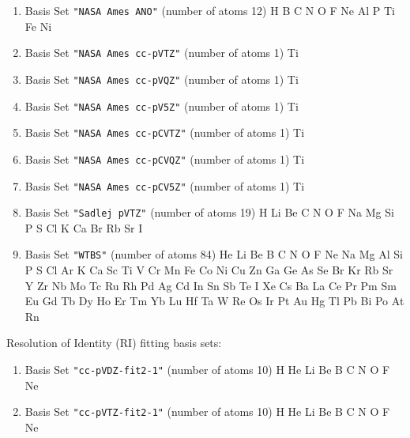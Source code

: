 \begin{enumerate}
\item Basis Set \verb#"NASA Ames ANO"# (number of atoms 12)  \newline
  H B C N O F Ne Al P Ti Fe Ni


\item Basis Set \verb#"NASA Ames cc-pVTZ"# (number of atoms 1)  \newline
  Ti


\item Basis Set \verb#"NASA Ames cc-pVQZ"# (number of atoms 1)  \newline
  Ti


\item Basis Set \verb#"NASA Ames cc-pV5Z"# (number of atoms 1)  \newline
  Ti


\item Basis Set \verb#"NASA Ames cc-pCVTZ"# (number of atoms 1)  \newline
  Ti


\item Basis Set \verb#"NASA Ames cc-pCVQZ"# (number of atoms 1)  \newline
  Ti


\item Basis Set \verb#"NASA Ames cc-pCV5Z"# (number of atoms 1)  \newline
  Ti


\item Basis Set \verb#"Sadlej pVTZ"# (number of atoms 19)  \newline
  H Li Be C N O F Na Mg Si P S Cl K Ca Br Rb Sr I


\item Basis Set \verb#"WTBS"# (number of atoms 84)  \newline
  He Li Be B C N O F Ne Na Mg Al Si P S Cl Ar K Ca Sc Ti V Cr Mn Fe
 Co Ni Cu Zn Ga Ge As Se Br Kr Rb Sr Y Zr Nb Mo Tc Ru Rh Pd Ag Cd In Sn Sb
 Te I Xe Cs Ba La Ce Pr Pm Sm Eu Gd Tb Dy Ho Er Tm Yb Lu Hf Ta W Re Os Ir
 Pt Au Hg Tl Pb Bi Po At Rn

\end{enumerate}

Resolution of Identity (RI) fitting basis sets:

\begin{enumerate}

\item Basis Set \verb#"cc-pVDZ-fit2-1"# (number of atoms 10)  \newline 
  H He Li Be B C N O F Ne


\item Basis Set \verb#"cc-pVTZ-fit2-1"# (number of atoms 10)  \newline 
  H He Li Be B C N O F Ne

\end{enumerate}

